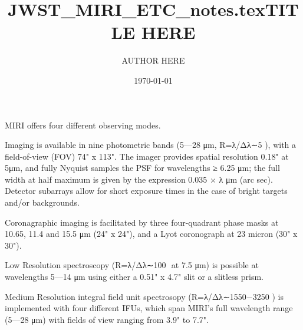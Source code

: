 \documentclass[11pt,a4paper]{article}
\begin{document}
   \title{JWST_MIRI_ETC_notes.texTITLE HERE}
  \author{AUTHOR HERE}
 \date{\today}
\maketitle


MIRI offers four different observing modes.

Imaging is available in nine photometric bands (5—28 μm, R=λ/Δλ∼5 ), with a field-of-view (FOV) 74" x 113". The imager provides spatial resolution 0.18" at 5μm, and fully Nyquist samples the PSF for wavelengths ≥ 6.25 μm; the full width at half maximum is given by the expression 0.035 × λ μm (arc sec).  Detector subarrays allow for short exposure times in the case of bright targets and/or backgrounds. 



Coronagraphic imaging is facilitated by three four-quadrant phase masks at 10.65, 11.4 and 15.5 μm (24" x 24"), and a Lyot coronograph at 23 micron (30" x 30"). 

Low Resolution spectroscopy (R=λ/Δλ∼100  at 7.5 μm) is possible at wavelengths 5—14 μm using either a 0.51" x 4.7" slit or a slitless prism. 

Medium Resolution integral field unit spectrosopy (R=λ/Δλ∼1550−3250 )  is implemented with four different IFUs, which span MIRI’s full wavelength range (5—28 μm) with fields of view ranging from 3.9" to 7.7".
\end{document}
